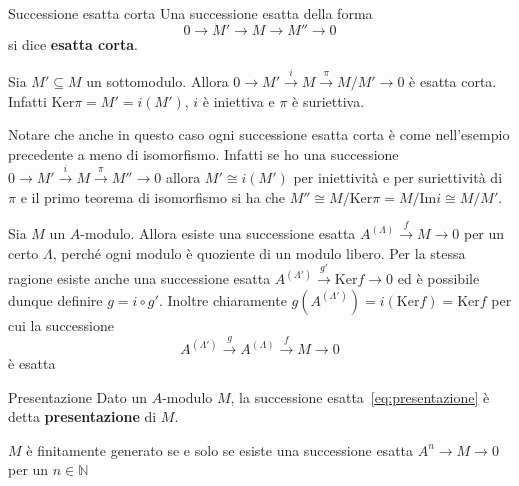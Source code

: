 \begin{definition}{Successione esatta corta}
    Una successione esatta della forma 
    \[
      0 \to M' \to M \to M'' \to 0
    \]
    si dice \textbf{esatta corta}.
\end{definition}

\begin{example}{}
    Sia \(M' \subseteq M \) un sottomodulo. Allora \(0 \to M' \overset{i}{\to} M
    \overset{\pi}{\to} M / M' \to 0\) è esatta corta. Infatti \(\mathrm{Ker}\pi
    = M' = i{(M')}\), \(i\) è iniettiva e \(\pi\) è suriettiva.
\end{example}
\begin{remark}{}
    Notare che anche in questo caso ogni successione esatta corta è come
    nell'esempio precedente a meno di isomorfismo. Infatti se ho una successione
    \(0 \to M' \overset{i}{\to} M \overset{\pi}{\to} M'' \to 0\) allora
    \(M' \cong i{(M')}\)
    per iniettività e per suriettività di \(\pi\) e il primo teorema di
    isomorfismo si ha che \(M'' \cong M / \mathrm{Ker}\pi = M / \mathrm{Im}i \cong
    M / M'\).
\end{remark}

\begin{remark}{}
    Sia \(M\) un \(A\)-modulo. Allora esiste una successione esatta
    \(A^{{(\Lambda)}} \overset{f}{\to} M \to 0\) per un certo \(\Lambda\),
    perché ogni modulo è quoziente di un modulo libero. Per la stessa ragione
    esiste anche una successione esatta \(A^{{(\Lambda')}} \overset{g'}{\to}
    \mathrm{Ker}f \to 0\) ed è possibile dunque definire \(g = i \circ g'\).
    Inoltre chiaramente \(g{(A^{{(\Lambda')}})} = i{(\mathrm{Ker}f)} =
    \mathrm{Ker}f\) per cui la successione
    \begin{equation}\label{eq:presentazione}
      A^{{(\Lambda')}} \overset{g}{\to} A^{{(\Lambda)}} \overset{f}{\to} M \to 0
    \end{equation}
    è esatta
\end{remark}

\begin{definition}{Presentazione}
    Dato un \(A\)-modulo \(M\), la successione esatta~\eqref{eq:presentazione} è
    detta \textbf{presentazione} di \(M\).
\end{definition}

\begin{remark}{}
    \(M\) è finitamente generato se e solo se esiste una successione esatta
    \(A^{n} \to M \to 0\) per un \(n \in \mathbb{N}\) 
\end{remark}

